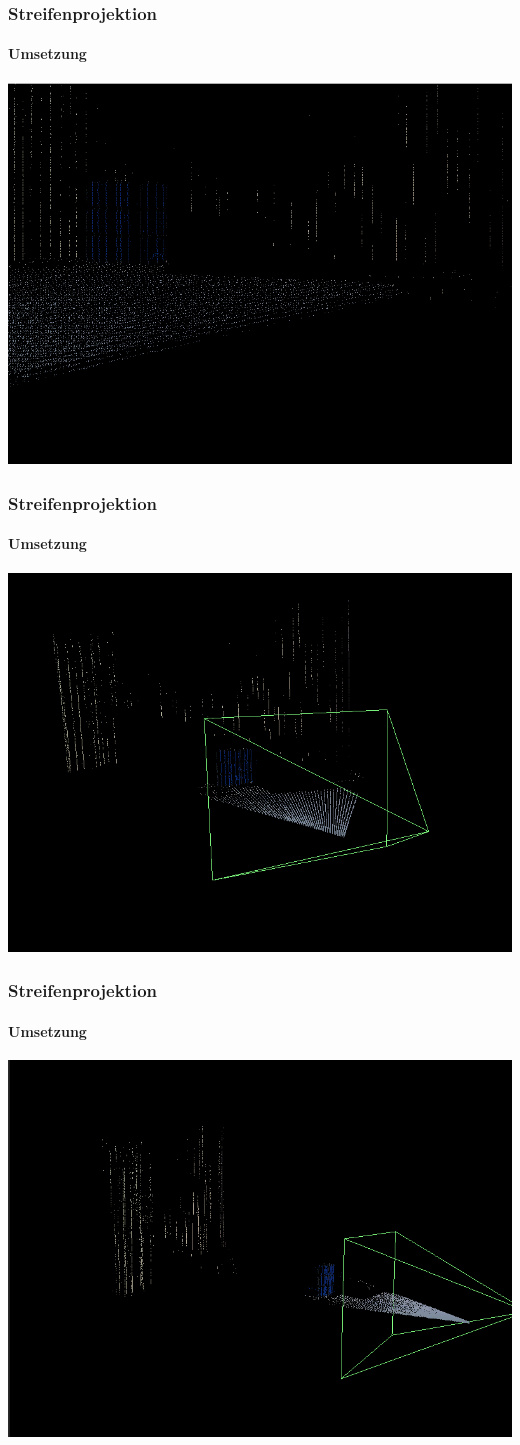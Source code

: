 \documentclass{beamer}
\begin{document}
\begin{frame}
	\frametitle{Streifenprojektion}
	\framesubtitle{Umsetzung}
	\includegraphics[width=0.9\linewidth]{includes/3d_2.png}
\end{frame}
\begin{frame}
	\frametitle{Streifenprojektion}
	\framesubtitle{Umsetzung}
	\includegraphics[width=0.9\linewidth]{includes/3d_3.png}
\end{frame}
\begin{frame}
	\frametitle{Streifenprojektion}
	\framesubtitle{Umsetzung}
	\includegraphics[width=0.9\linewidth]{includes/3d_4.png}
\end{frame}
\end{document}

